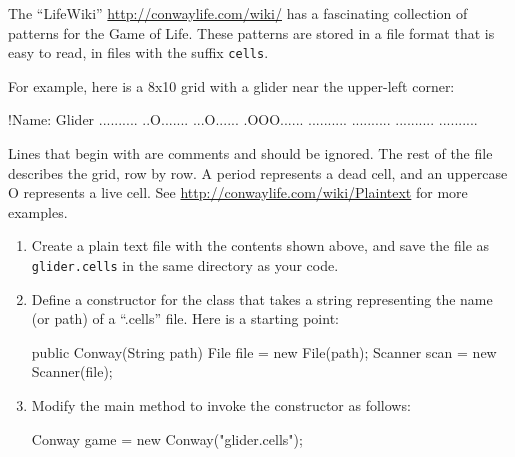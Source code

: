 

\begin{exercise}


The ``LifeWiki'' \url{http://conwaylife.com/wiki/} has a fascinating collection of patterns for the Game of Life.
These patterns are stored in a file format that is easy to read, in files with the suffix {\tt cells}.

For example, here is a 8x10 grid with a glider near the upper-left corner:

\begin{stdout}
!Name: Glider
..........
..O.......
...O......
.OOO......
..........
..........
..........
..........
\end{stdout}

Lines that begin with \java{!} are comments and should be ignored.
The rest of the file describes the grid, row by row.
A period represents a dead cell, and an uppercase O represents a live cell.
See \url{http://conwaylife.com/wiki/Plaintext} for more examples.

\begin{enumerate}

\item Create a plain text file with the contents shown above, and save the file as \verb|glider.cells| in the same directory as your code.


\item Define a constructor for the  class that takes a string representing the name (or path) of a ``.cells'' file.
Here is a starting point:

\begin{code}
public Conway(String path) {
    File file = new File(path);
    Scanner scan = new Scanner(file);
}
\end{code}

\item Modify the main method to invoke the constructor as follows:

\begin{code}
Conway game = new Conway("glider.cells");
\end{code}


\end{enumerate}
\end{exercise}
